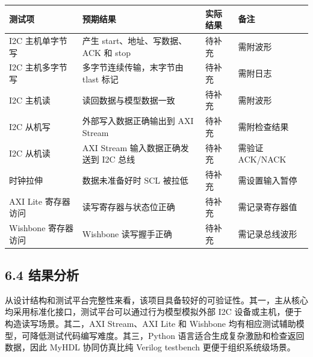 {\def\LTcaptype{none} %
\begin{longtable}[]{@{}
  >{\raggedright\arraybackslash}p{}
  >{\raggedright\arraybackslash}p{}
  >{\raggedright\arraybackslash}p{}
  >{\raggedright\arraybackslash}p{}@{}}
\toprule\noalign{}
\begin{minipage}[b]{\linewidth}\raggedright
测试项
\end{minipage} & \begin{minipage}[b]{\linewidth}\raggedright
预期结果
\end{minipage} & \begin{minipage}[b]{\linewidth}\raggedright
实际结果
\end{minipage} & \begin{minipage}[b]{\linewidth}\raggedright
备注
\end{minipage} \\
\midrule\noalign{}
\endhead
\bottomrule\noalign{}
\endlastfoot
I2C 主机单字节写 & 产生 start、地址、写数据、ACK 和 stop & 待补充 &
需附波形 \\
I2C 主机多字节写 & 多字节连续传输，末字节由 tlast 标记 & 待补充 &
需附日志 \\
I2C 主机读 & 读回数据与模型数据一致 & 待补充 & 需附波形 \\
I2C 从机写 & 外部写入数据正确输出到 AXI Stream & 待补充 &
需附检查结果 \\
I2C 从机读 & AXI Stream 输入数据正确发送到 I2C 总线 & 待补充 & 需验证
ACK/NACK \\
时钟拉伸 & 数据未准备好时 SCL 被拉低 & 待补充 & 需设置输入暂停 \\
AXI Lite 寄存器访问 & 读写寄存器与状态位正确 & 待补充 &
需记录寄存器值 \\
Wishbone 寄存器访问 & Wishbone 读写握手正确 & 待补充 & 需记录总线波形 \\
\end{longtable}
}

\subsection{6.4 结果分析}\label{ux7ed3ux679cux5206ux6790}

从设计结构和测试平台完整性来看，该项目具备较好的可验证性。其一，主从核心均采用标准化接口，测试平台可以通过行为模型模拟外部
I2C 设备或主机，便于构造读写场景。其二，AXI Stream、AXI Lite 和 Wishbone
均有相应测试辅助模型，可降低测试代码编写难度。其三，Python
语言适合生成复杂激励和检查返回数据，因此 MyHDL 协同仿真比纯 Verilog
testbench 更便于组织系统级场景。

